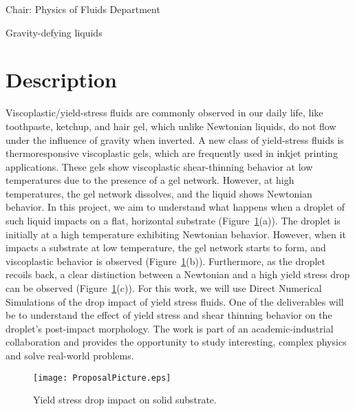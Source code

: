 \documentclass[a4paper,10pt]{article}
\begin{document}
 
\thispagestyle{empty} %

\noindent Chair: Physics of Fluids Department
\begin{center}
 \begin{LARGE}
  Gravity-defying liquids
 \end{LARGE}
\end{center}

\section*{Description}
Viscoplastic/yield-stress fluids are commonly observed in our daily life, like toothpaste, ketchup, and hair gel, which unlike Newtonian liquids, do not flow under the influence of gravity when inverted. A new class of yield-stress fluids is thermoresponsive viscoplastic gels, which are frequently used in inkjet printing applications. These gels show viscoplastic shear-thinning behavior at low temperatures due to the presence of a gel network. However, at high temperatures, the gel network dissolves, and the liquid shows Newtonian behavior. In this project, we aim to understand what happens when a droplet of such liquid impacts on a flat, horizontal substrate (Figure~\ref{Fig::Fig1}(a)). The droplet is initially at a high temperature exhibiting Newtonian behavior. However, when it impacts a substrate at low temperature, the gel network starts to form, and viscoplastic behavior is observed (Figure~\ref{Fig::Fig1}(b)). Furthermore, as the droplet recoils back, a clear distinction between a Newtonian and a high yield stress drop can be observed (Figure~\ref{Fig::Fig1}(c)). For this work, we will use Direct Numerical Simulations of the drop impact of yield stress fluids. One of the deliverables will be to understand the effect of yield stress and shear thinning behavior on the droplet's post-impact morphology. The work is part of an academic-industrial collaboration and provides the opportunity to study interesting, complex physics and solve real-world problems. 
\begin{figure}[H]
 \begin{center}
  \texttt{[image: ProposalPicture.eps]}
 \end{center}
 \caption{Yield stress drop impact on solid substrate.}
 \label{Fig::Fig1}
\end{figure}
\end{document}
